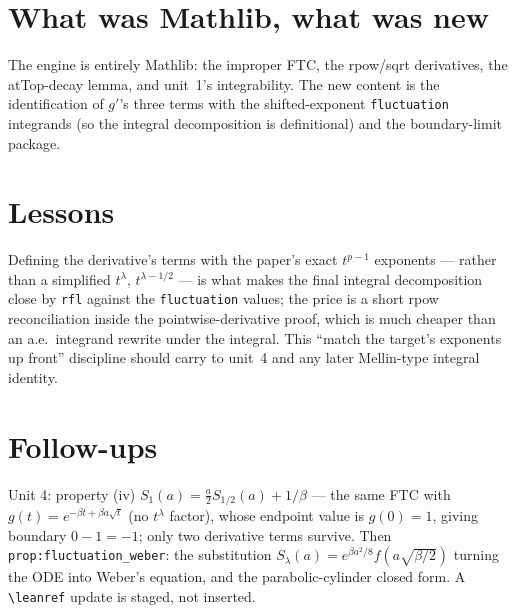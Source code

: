 \documentclass[11pt]{article}
\begin{document}
\section{What was Mathlib, what was new}
The engine is entirely Mathlib: the improper FTC, the rpow/sqrt derivatives, the atTop-decay lemma,
and unit~1's integrability. The new content is the identification of $g'$'s three terms with the
shifted-exponent \texttt{fluctuation} integrands (so the integral decomposition is definitional) and
the boundary-limit package.

\section{Lessons}
Defining the derivative's terms with the paper's exact $t^{p-1}$ exponents --- rather than a
simplified $t^\lambda$, $t^{\lambda-1/2}$ --- is what makes the final integral decomposition close by
\texttt{rfl} against the \texttt{fluctuation} values; the price is a short rpow reconciliation inside
the pointwise-derivative proof, which is much cheaper than an a.e.\ integrand rewrite under the
integral. This ``match the target's exponents up front'' discipline should carry to unit~4 and any
later Mellin-type integral identity.

\section{Follow-ups}
Unit 4: property (iv) $S_1(a)=\tfrac{a}{2}S_{1/2}(a)+1/\beta$ --- the same FTC with $g(t)=e^{-\beta
t+\beta a\sqrt t}$ (no $t^\lambda$ factor), whose endpoint value is $g(0)=1$, giving boundary
$0-1=-1$; only two derivative terms survive. Then \texttt{prop:fluctuation\_weber}: the substitution
$S_\lambda(a)=e^{\beta a^2/8}f(a\sqrt{\beta/2})$ turning the ODE into Weber's equation, and the
parabolic-cylinder closed form. A \texttt{\textbackslash leanref} update is staged, not inserted.
\end{document}
